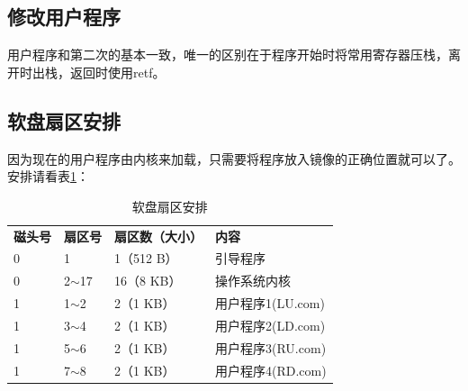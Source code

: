 \documentclass[a4paper, 11pt]{article} %
\begin{document}
\subsection{修改用户程序}
用户程序和第二次的基本一致，唯一的区别在于程序开始时将常用寄存器压栈，离开时出栈，返回时使用retf。

\subsection{软盘扇区安排}

因为现在的用户程序由内核来加载，只需要将程序放入镜像的正确位置就可以了。安排请看表\ref{tab:sectortable}：
\FloatBarrier
\begin{table}[]
  \caption{软盘扇区安排}
  \label{tab:sectortable}
  \begin{tabular}{llll}
  \rowcolor[HTML]{FFFFFF} 
  {\color[HTML]{333333} \textbf{磁头号}} & {\color[HTML]{333333} \textbf{扇区号}} & {\color[HTML]{333333} \textbf{扇区数（大小）}} & {\color[HTML]{333333} \textbf{内容}} \\
  \rowcolor[HTML]{FFFFFF} 
  {\color[HTML]{333333} 0}            & {\color[HTML]{333333} 1}            & {\color[HTML]{333333} 1（512 B）}         & {\color[HTML]{333333} 引导程序}        \\
  \rowcolor[HTML]{FFFFFF} 
  {\color[HTML]{333333} 0}            & {\color[HTML]{333333} 2$\sim$17}    & {\color[HTML]{333333} 16（8 KB）}         & {\color[HTML]{333333} 操作系统内核}      \\
  \rowcolor[HTML]{F8F8F8} 
  {\color[HTML]{333333} 1}            & {\color[HTML]{333333} 1$\sim$2}     & {\color[HTML]{333333} 2（1 KB）}          & {\color[HTML]{333333} 用户程序1(LU.com)}       \\
  \rowcolor[HTML]{FFFFFF} 
  {\color[HTML]{333333} 1}            & {\color[HTML]{333333} 3$\sim$4}     & {\color[HTML]{333333} 2（1 KB）}          & {\color[HTML]{333333} 用户程序2(LD.com)}       \\
  \rowcolor[HTML]{F8F8F8} 
  {\color[HTML]{333333} 1}            & {\color[HTML]{333333} 5$\sim$6}     & {\color[HTML]{333333} 2（1 KB）}          & {\color[HTML]{333333} 用户程序3(RU.com)}       \\
  \rowcolor[HTML]{FFFFFF} 
  {\color[HTML]{333333} 1}            & {\color[HTML]{333333} 7$\sim$8}     & {\color[HTML]{333333} 2（1 KB）}          & {\color[HTML]{333333} 用户程序4(RD.com)}      
  \end{tabular}
  \end{table}
\end{document}
